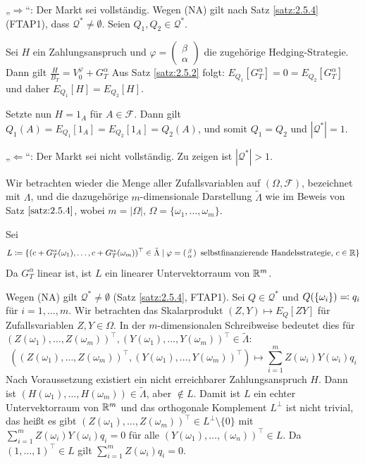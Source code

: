 \documentclass[a4paper,twoside,DIV15,BCOR12mm]{scrbook}
\newcommand{\cF}{\mathcal F}
\newcommand{\cQ}{\mathcal Q}
\begin{document}
\begin{beweis}
„$\Longrightarrow$“: Der Markt sei vollständig. Wegen (NA) gilt nach Satz \ref{satz:2.5.4} (FTAP1), dass $\cQ^* \ne \emptyset$. Seien $Q_1,Q_2\in \cQ^*$.


Sei $H$ ein Zahlungsanspruch und
$\varphi=\left(\begin{smallmatrix} \beta \\ \alpha \end{smallmatrix}\right)$
die zugehörige Hedging-Strategie. Dann gilt
$ \frac{H}{B_T} = V_0^\varphi + G_T^\alpha $
Aus Satz \ref{satz:2.5.2} folgt: $E_{Q_1}[G_T^\alpha] = 0 = E_{Q_2}[G_T^\alpha]$ und daher $E_{Q_1}[H] = E_{Q_2}[H]$.

Setzte nun $H=1_A$ für $A\in \cF$. Dann gilt $Q_1(A) = E_{Q_1}[1_A] = E_{Q_2}[1_A] = Q_2(A)$, und somit $Q_1 = Q_2$ und $|\cQ^*|=1$.

„$\Longleftarrow$“: Der Markt sei nicht vollständig. Zu zeigen ist $|\cQ^*|>1$.

Wir betrachten wieder die Menge aller Zufallsvariablen auf $(\Omega,\cF)$, bezeichnet mit $\Lambda$, und die dazugehörige $m$-dimensionale Darstellung $\tilde\Lambda$ wie im Beweis von Satz $\ref{satz:2.5.4}$, wobei $m=|\Omega|$, $\Omega = \{\omega_1,\ldots,\omega_m\}$.

Sei
\[
L \da \{ (c + G_T^\alpha(\omega_1), \ldots, c+ G_T^\alpha(\omega_m))^\top \in \tilde\Lambda \mid \varphi=\left(\begin{smallmatrix} \beta \\ \alpha \end{smallmatrix}\right)
\text{ selbstfinanzierende Handelsstrategie, } c\in \MdR\}
\]
Da $G_T^\alpha$ linear ist, ist $L$ ein linearer Untervektorraum von $\mathbb{R}^m$.

Wegen (NA) gilt $\cQ^*\ne \emptyset$ (Satz \ref{satz:2.5.4}, FTAP1). Sei $Q\in\cQ^*$ und $Q(\{\omega_i\})\ad q_i$ für $i=1,\ldots,m$. Wir betrachten das Skalarprodukt $(Z,Y)\mapsto E_Q[ZY]$ für Zufallsvariablen $Z,Y\in\Omega$. In der $m$-dimensionalen Schreibweise bedeutet dies für $(Z(\omega_1),\ldots,Z(\omega_m))^\top, (Y(\omega_1),\ldots,Y(\omega_m))^\top\in \tilde\Lambda$:
\[
((Z(\omega_1),\ldots,Z(\omega_m))^\top, (Y(\omega_1),\ldots,Y(\omega_m))^\top) \mapsto \sum_{i=1}^m Z(\omega_i)Y(\omega_i)q_i
\]
Nach Voraussetzung existiert ein nicht erreichbarer Zahlungsanspruch $H$. Dann ist $(H(\omega_1),\ldots,H(\omega_m)) \in \tilde\Lambda$, aber $\notin L$. Damit ist $L$ ein echter Untervektorraum von $\mathbb{R}^m$ und das orthogonale Komplement $L^\bot$ ist nicht trivial, das heißt  es gibt $(Z(\omega_1),\ldots,Z(\omega_m))^\top\in L^\bot\setminus\{0\}$ mit $\sum_{i=1}^m Z(\omega_i)Y(\omega_i)q_i= 0$ für alle $(Y(\omega_1),\ldots,(\omega_n))^\top\in L$. Da $(1,\ldots,1)^\top\in L$ gilt $\sum_{i=1}^mZ(\omega_i)q_i = 0$.


\end{beweis}
\end{document}

